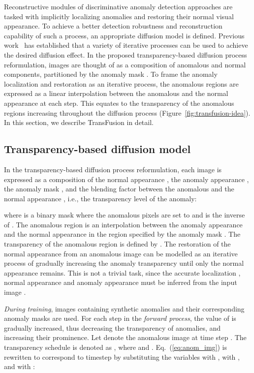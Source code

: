 \documentclass[10pt,twocolumn,letterpaper]{article}
\begin{document}
Reconstructive modules of discriminative anomaly detection approaches are tasked with implicitly localizing anomalies and restoring their normal visual appearance. To achieve a better detection robustness and reconstruction capability of such a process, an appropriate diffusion model is defined. Previous work~\cite{cold-diffusion} has established that a variety of iterative processes can be used to achieve the desired diffusion effect. In the proposed transparency-based diffusion process reformulation, images are thought of as a composition of anomalous and normal components, partitioned by the anomaly mask . To frame the anomaly localization and restoration as an iterative process, the anomalous regions are expressed as a linear interpolation between the anomalous and the normal appearance at each step. This equates to the transparency of the anomalous regions increasing throughout the diffusion process (Figure~\ref{fig:transfusion-idea}). In this section, we describe TransFusion in detail.

\subsection{Transparency-based diffusion model}
\label{ch:diff_proc}

In the transparency-based diffusion process reformulation, each image  is expressed as a composition of the normal appearance , the anomaly appearance , the anomaly mask , and the blending factor between the anomalous and the normal appearance , i.e., the transparency level of the anomaly:

where  is a binary mask where the anomalous pixels are set to  and  is the inverse of . The anomalous region is an interpolation between the anomaly appearance  and the normal appearance  in the region specified by the anomaly mask . The transparency of the anomalous region is defined by . The restoration of the normal appearance from an anomalous image  can be modelled as an iterative process of gradually increasing the anomaly transparency until only the normal appearance remains. This is not a trivial task, since the accurate localization , normal appearance  and anomaly appearance  must be inferred from the input image .

\textit{During training}, images containing synthetic anomalies and their corresponding anomaly masks are used.
For each step in the \textit{forward process}, the value of  is gradually increased, thus decreasing the transparency of anomalies, and increasing their prominence. Let  denote the anomalous image  at time step . The transparency schedule is denoted as , where  and . Eq.~(\ref{eq:anom_img}) is rewritten to correspond to timestep  by substituting the variables  with ,  with , and  with : 
  
\end{document}
